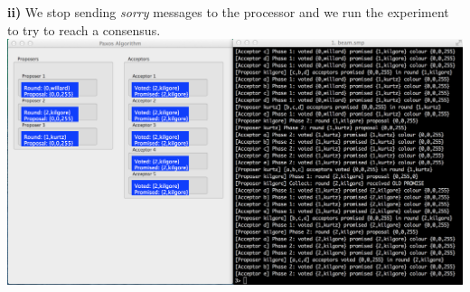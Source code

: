 \documentclass[a4paper, 11pt]{article}
\begin{document}
\newpage
\textbf{ii)} We stop sending \textit{sorry} messages to the processor and we run the experiment to try to reach a consensus.\\
\includegraphics[scale=0.35]{images/exp4.png} \\\\
\end{document}
